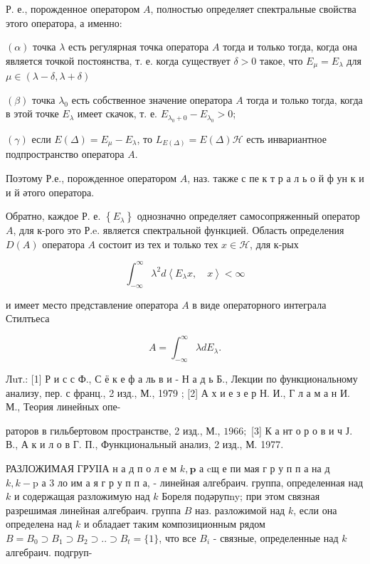\documentclass[10pt]{article}
\begin{document}
Р. е., порожденное оператором $A$, полностью определяет спектральные свойства этого оператора, а именно:



$(\alpha)$ точка $\lambda$ есть регулярная точка оператора $A$ тогда и только тогда, когда она является точкой постоянства, т. е. когда существует $\delta>0$ такое, что $E_{\mu}=E_{\lambda}$ для $\mu \in(\lambda-\delta, \lambda+\delta)$



$(\beta)$ точка $\lambda_{0}$ есть собственное значение оператора $A$ тогда и только тогда, когда в этой точке $E_{\lambda}$ имеет скачок, т. е. $E_{\lambda_{0}+0}-E_{\lambda_{0}}>0$;



$(\gamma)$ если $E(\Delta)=E_{\mu}-E_{\lambda}$, то $L_{E(\Delta)}=E(\Delta) \mathscr{H}$ есть инвариантное подпространство оператора $A$.



Поэтому Р.е., порожденное оператором $A$, наз. также с пе к т р а л ь о й ф ун к и и й әтого оператора.



Обратно, каждое Р. е. $\left\{E_{\lambda}\right\}$ однозначно определяет самосопряженный оператор $A$, для к-рого это Р.e. является спектральной функцией. Область определения $D(A)$ оператора $A$ состоит из тех и только тех $x \in \mathscr{H}$, для к-рых



\[

\int_{-\infty}^{\infty} \lambda^{2} d\left\langle E_{\lambda} x, \quad x\right\rangle<\infty

\]



и имеет место представление оператора $A$ в виде операторного интеграла Стилтьеса



\[

A=\int_{-\infty}^{\infty} \lambda d E_{\lambda} .

\]



Лuт.: [1] Р и с с Ф., С ё к е ф а ль в и - Н а д ь Б., Лекции по функциональному анализу, пер. с франц., 2 изд., М., 1979 ; [2] А х и е з е р Н. И., Г л а м а н И. М., Теория линейных опе-

раторов в гильбертовом пространстве, 2 изд., М., $1966 ;$ [3] К а нт о р о в и ч Ј. В., А к и л о в Г. П., Функциональный анализ, 2 изд., М. 1977.



РАЗЛОЖИМАЯ ГРУІІА н а д п о л е м $k, \mathbf{p}$ а cщ е пи мая г р у п п а на д $k, k-\mathrm{p}$ а 3 ло им а я г р у п п а, - линейная алгебраич. группа, определенная над $k$ и содержащая разложимую над $k$ Бореля подәрупny; при этом связная разрешимая линейная алгебраич. группа $B$ наз. разложимой над $k$, если она определена над $k$ и обладает таким композиционным рядом $B=B_{0} \supset B_{1} \supset B_{2} \supset . . \supset B_{t}=\{1\}$, что все $B_{i}$ - связные, определенные над $k$ алгебраич. подгруп-
\end{document}
